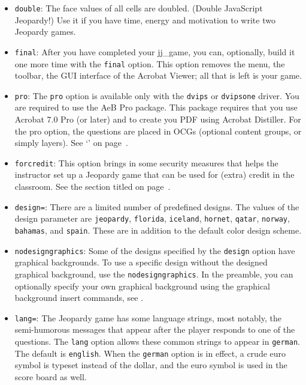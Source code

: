 \documentclass{article}
\def\jj{\textsf{jj\_game}}
\begin{document}
\begin{itemize}
\item \texttt{double}: The face values of all cells are doubled.
(Double JavaScript Jeopardy!) Use it if you have time, energy and motivation
to write two Jeopardy games.

\item \texttt{final}: After you have completed your
{\jj}, you can, optionally, build it one more time with
the \texttt{final} option. This option removes the menu, the
toolbar, the GUI interface of the Acrobat Viewer; all that is left
is your game.


\item \texttt{pro}: The \texttt{pro} option is available only with
the \texttt{dvips} or \texttt{dvipsone} driver. You are required to
use the AeB Pro package. This package requires that you use Acrobat
7.0 Pro (or later) and to create you PDF using Acrobat Distiller.
For the pro option, the questions are placed in OCGs (optional
content groups, or simply layers). See `' on
page~\pageref*{proOption}.

\item \texttt{forcredit}: This option brings in some security measures
that helps the instructor set up a Jeopardy game that can be used
for (extra) credit in the classroom. See the section titled
 on page~\pageref*{forcreditOption}.

\item \texttt{design=}: There are a limited number of
predefined designs. The values of the design parameter are
\texttt{jeopardy}, \texttt{florida}, \texttt{iceland},
\texttt{hornet}, \texttt{qatar}, \texttt{norway}, \texttt{bahamas},
and \texttt{spain}. These are in addition to the default color design scheme.

\item \texttt{nodesigngraphics}: Some of the designs specified by
the \texttt{design} option have graphical backgrounds.  To use a
specific design without the designed graphical background, use the
\texttt{nodesigngraphics}.  In the preamble, you can optionally
specify your own graphical background using the graphical background
insert commands, see .

\item \texttt{lang=}: The Jeopardy game has some
language strings, most notably, the semi-humorous messages that
appear after the player responds to one of the questions. The
\texttt{lang} option allows these common strings to appear in
\texttt{german}. The default is \texttt{english}. When the \texttt{german}
option is in effect, a crude euro symbol is typeset instead of the
dollar, and the euro symbol is used in the score board as well.


\end{itemize}
\end{document}
